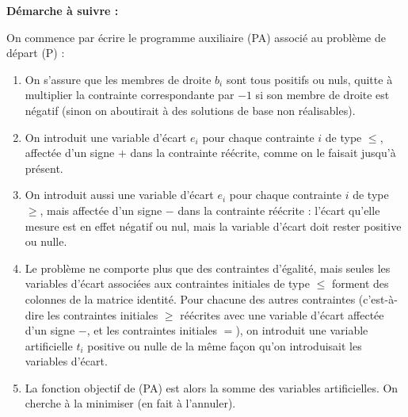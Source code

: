 \documentclass[a4paper,12pt,openany]{book}
\newenvironment{colorframed}{%
	\def\FrameCommand{\fboxsep=10pt \fcolorbox{black}{bggray}}%
	\MakeFramed{\advance\hsize-\width \FrameRestore}%
}{\endMakeFramed}
\theoremstyle{plain}
\theoremstyle{definition}
\theoremstyle{remark}
\theoremstyle{nbstyle}
\begin{document}
	
	\begin{colorframed}
		{\color{titleblue}\textbf{Démarche à suivre :}}
		
		\medskip
		
		On commence par écrire le {\color{keywordred}programme auxiliaire (PA)} associé au {\color{keywordred}problème de départ (P)} :
		
		\begin{enumerate}[label=\arabic*.]
			\item On s'assure que les {\color{vargreen}membres de droite $b_i$} sont tous {\color{keywordred}positifs ou nuls}, quitte à multiplier la contrainte correspondante par {\color{mathblue}$-1$} si son membre de droite est {\color{keywordred}négatif} (sinon on aboutirait à des {\color{keywordred}solutions de base non réalisables}).
			
			\item On introduit une {\color{vargreen}variable d'écart $e_i$} pour chaque contrainte $i$ de type {\color{mathblue}$\leq$}, affectée d’un signe {\color{mathblue}$+$} dans la contrainte réécrite, comme on le faisait jusqu'à présent.
			
			\item On introduit aussi une {\color{vargreen}variable d'écart $e_i$} pour chaque contrainte $i$ de type {\color{mathblue}$\geq$}, mais affectée d’un signe {\color{mathblue}$-$} dans la contrainte réécrite : l’écart qu’elle mesure est en effet {\color{keywordred}négatif ou nul}, mais la variable d’écart doit rester {\color{keywordred}positive ou nulle}.
			
			\item Le problème ne comporte plus que des contraintes d’{\color{keywordred}égalité}, mais seules les {\color{vargreen}variables d’écart associées aux contraintes initiales de type {\color{mathblue}$\leq$}} forment des colonnes de la matrice identité. Pour chacune des autres contraintes (c’est-à-dire les contraintes initiales {\color{mathblue}$\geq$} réécrites avec une variable d’écart affectée d’un signe {\color{mathblue}$-$}, et les contraintes initiales {\color{mathblue}$=$}), on introduit une {\color{vargreen}variable artificielle $t_i$} {\color{keywordred}positive ou nulle} de la même façon qu’on introduisait les variables d’écart.
			
			\item La {\color{keywordred}fonction objectif de (PA)} est alors la {\color{vargreen}somme des variables artificielles}. On cherche à la {\color{keywordred}minimiser} (en fait à l’{\color{keywordred}annuler}).
		\end{enumerate}
	\end{colorframed}
	
\end{document}
